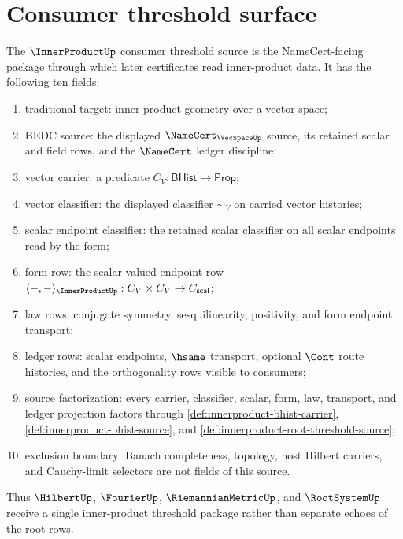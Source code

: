 \section{Consumer threshold surface}
\label{sec:innerproduct-consumer-threshold-surface}

\begin{definition}
\label{def:innerproduct-consumer-threshold-source}
The $\InnerProductUp$ consumer threshold source is the NameCert-facing
package through which later certificates read inner-product data. It has the
following ten fields:
\begin{enumerate}
  \item traditional target: inner-product geometry over a vector space;
  \item BEDC source: the displayed $\NameCert_{\VecSpaceUp}$ source, its
  retained scalar and field rows, and the $\NameCert$ ledger discipline;
  \item vector carrier: a predicate
  $C_V:\mathsf{BHist}\to\mathsf{Prop}$;
  \item vector classifier: the displayed classifier $\sim_V$ on carried
  vector histories;
  \item scalar endpoint classifier: the retained scalar classifier on all
  scalar endpoints read by the form;
  \item form row: the scalar-valued endpoint row
  $\langle-,-\rangle_{\InnerProductUp}:C_V\times C_V\to C_{\mathsf{scal}}$;
  \item law rows: conjugate symmetry, sesquilinearity, positivity, and form
  endpoint transport;
  \item ledger rows: scalar endpoints, $\hsame$ transport, optional $\Cont$
  route histories, and the orthogonality rows visible to consumers;
  \item source factorization: every carrier, classifier, scalar, form, law,
  transport, and ledger projection factors through
  \autoref{def:innerproduct-bhist-carrier},
  \autoref{def:innerproduct-bhist-source}, and
  \autoref{def:innerproduct-root-threshold-source};
  \item exclusion boundary: Banach completeness, topology, host Hilbert
  carriers, and Cauchy-limit selectors are not fields of this source.
\end{enumerate}
Thus $\HilbertUp$, $\FourierUp$, $\RiemannianMetricUp$, and $\RootSystemUp$
receive a single inner-product threshold package rather than separate echoes
of the root rows.
\end{definition}

